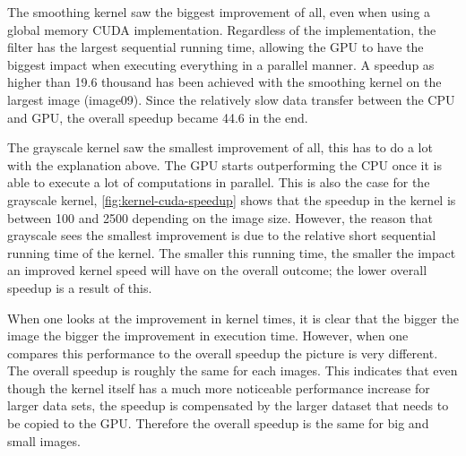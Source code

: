 \documentclass[final]{report}
\begin{document}
The smoothing kernel saw the biggest improvement of all, even when using a global memory CUDA implementation.
Regardless of the implementation, the filter has the largest sequential running time, allowing the GPU to have the biggest impact when executing everything in a parallel manner.
A speedup as higher than \num{19.6} thousand has been achieved with the smoothing kernel on the largest image (image09).
Since the relatively slow data transfer between the CPU and GPU, the overall speedup became \num{44.6} in the end.

The grayscale kernel saw the smallest improvement of all, this has to do a lot with the explanation above.
The GPU starts outperforming the CPU once it is able to execute a lot of computations in parallel.
This is also the case for the grayscale kernel, \cref{fig:kernel-cuda-speedup} shows that the speedup in the kernel is between \num{100} and \num{2500} depending on the image size.
However, the reason that grayscale sees the smallest improvement is due to the relative short sequential running time of the kernel.
The smaller this running time, the smaller the impact an improved kernel speed will have on the overall outcome; the lower overall speedup is a result of this.

When one looks at the improvement in kernel times, it is clear that the bigger the image the bigger the improvement in execution time.
However, when one compares this performance to the overall speedup the picture is very different.
The overall speedup is roughly the same for each images.
This indicates that even though the kernel itself has a much more noticeable performance increase for larger data sets, the speedup is compensated by the larger dataset that needs to be copied to the GPU.
Therefore the overall speedup is the same for big and small images.
\end{document}
